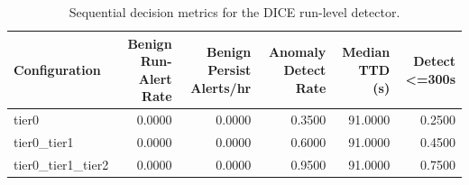 \begin{table}[t]
\centering
\caption{Sequential decision metrics for the DICE run-level detector.}
\label{tab:dice_sequential_metrics}
\footnotesize
\begin{tabular}{lrrrrr}
\toprule
Configuration & Benign Run-Alert Rate & Benign Persist Alerts/hr & Anomaly Detect Rate & Median TTD (s) & Detect <=300s \\
\midrule
tier0 & 0.0000 & 0.0000 & 0.3500 & 91.0000 & 0.2500 \\
tier0_tier1 & 0.0000 & 0.0000 & 0.6000 & 91.0000 & 0.4500 \\
tier0_tier1_tier2 & 0.0000 & 0.0000 & 0.9500 & 91.0000 & 0.7500 \\
\bottomrule
\end{tabular}

\end{table}
